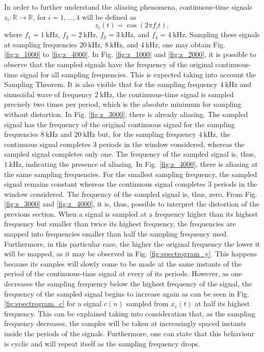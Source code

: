 \documentclass[a4paper, oneside, 11pt]{article}
\begin{document}
In order to further understand the aliasing phenomena, continuous-time signals $z_i: \mathbb{R} \rightarrow \mathbb{R}$, for $i = 1, ..., 4$ will be defined as
\begin{equation}
    z_i (t) = \cos ( 2 \pi f_i t),
\end{equation}
where $f_1 = \SI{1}{\kilo \hertz}$, $f_2 = \SI{2}{\kilo \hertz}$, $f_3 = \SI{3}{\kilo \hertz}$, and $f_4 = \SI{4}{\kilo \hertz}$. Sampling these signals at sampling frequencies $\SI{20}{\kilo \hertz}$, $\SI{8}{\kilo \hertz}$, and $\SI{4}{\kilo \hertz}$, one may obtain Fig. \ref{fig:z_1000} to \ref{fig:z_4000}. In Fig. \ref{fig:z_1000} and \ref{fig:z_2000}, it is possible to observe that the sampled signals have the frequency of the original continuous-time signal for all sampling frequencies. This is expected taking into account the Sampling Theorem. It is also visible that for the sampling frequency $\SI{4}{\kilo \hertz}$ and sinusoidal wave of frequency $\SI{2}{\kilo \hertz}$, the continuous-time signal is sampled precisely two times per period, which is the absolute minimum for sampling without distortion. In Fig. \ref{fig:z_3000}, there is already aliasing. The sampled signal has the frequency of the original continuous signal for the sampling frequencies $\SI{8}{\kilo \hertz}$ and $\SI{20}{\kilo \hertz}$ but, for the sampling frequency $\SI{4}{\kilo \hertz}$, the continuous signal completes 3 periods in the window considered, whereas the sampled signal completes only one. The frequency of the sampled signal is, thus, $\SI{1}{\kilo \hertz}$, indicating the presence of aliasing. In Fig. \ref{fig:z_4000}, there is aliasing at the same sampling frequencies. For the smallest sampling frequency, the sampled signal remains constant whereas the continuous signal completes 3 periods in the window considered. The frequency of the sampled signal is, thus, zero. From Fig. \ref{fig:z_3000} and \ref{fig:z_4000}, it is, thus, possible to interpret the distortion of the previous section. When a signal is sampled at a frequency higher than its highest frequency but smaller than twice its highest frequency, the frequencies are mapped into frequencies smaller than half the sampling frequency used. Furthermore, in this particular case, the higher the original frequency the lower it will be mapped, as it may be observed in Fig. \ref{fig:spectrogram_y}. This happens because its samples will slowly come to be made at the same instants of the period of the continuous-time signal at every of its periods. However, as one decreases the sampling frequency below the highest frequency of the signal, the frequency of the sampled signal begins to increase again as can be seen in Fig. \ref{fig:spectrogram_c} for a signal $c(n)$ sampled from $x_c(t)$ at half its highest frequency. This can be explained taking into consideration that, as the sampling frequency decreases, the samples will be taken at increasingly spaced instants inside the periods of the signals. Furthermore, one can state that this behaviour is cyclic and will repeat itself as the sampling frequency drops.
\end{document}
